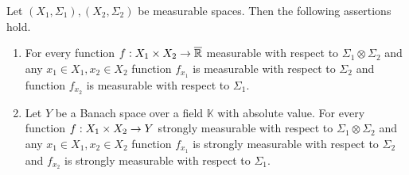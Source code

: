 \begin{proposition}\label{proposition:measurable_functions_have_measurable_sections}
Let $(X_1,\Sigma_1), (X_2,\Sigma_2)$ be measurable spaces. Then the following assertions hold.
\begin{enumerate}[label=\emph{\textbf{(\arabic*)}}, leftmargin=*]
\item For every function $f:X_1\times X_2\rightarrow \overline{{\mathbb R}}$ measurable with respect to $\Sigma_1\otimes \Sigma_2$ and any $x_1\in X_1,x_2\in X_2$ function $f_{x_1}$ is measurable with respect to $\Sigma_2$ and function $f_{x_2}$ is measurable with respect to $\Sigma_1$.
\item Let $Y$ be a Banach space over a field $\mathbb{K}$ with absolute value. For every function $f:X_1\times X_2\rightarrow Y$ strongly measurable with respect to $\Sigma_1\otimes \Sigma_2$ and any $x_1\in X_1,x_2\in X_2$ function $f_{x_1}$ is strongly measurable with respect to $\Sigma_2$ and $f_{x_2}$ is strongly measurable with respect to $\Sigma_1$.
\end{enumerate}
\end{proposition}
